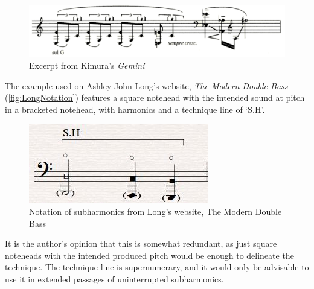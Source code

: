   
\begin{figure}
  \includegraphics[width=\linewidth]{./resources/kimura_gemini.png}
  \caption{Excerpt from Kimura's \emph{Gemini}}\label{fig:Excerpt from Kimura's Gemini}
\end{figure}

The example used on Ashley John Long's website, \emph{The Modern Double Bass} (\autoref{fig:LongNotation}) features a square notehead with the intended sound at pitch in a bracketed notehead, with harmonics and a technique line of `S.H'.\autocite[]{longSubharmonics2019}

\begin{figure}
  \includegraphics[width=\linewidth]{./resources/longSubharmonicNotation.jpg}
  \caption{Notation of subharmonics from Long's website, The Modern Double Bass}\label{fig:LongNotation}
\end{figure}

It is the author's opinion that this is somewhat redundant, as just square noteheads with the intended produced pitch would be enough to delineate the technique. 
The technique line is supernumerary, and it would only be advisable to use it in extended passages of uninterrupted subharmonics.


